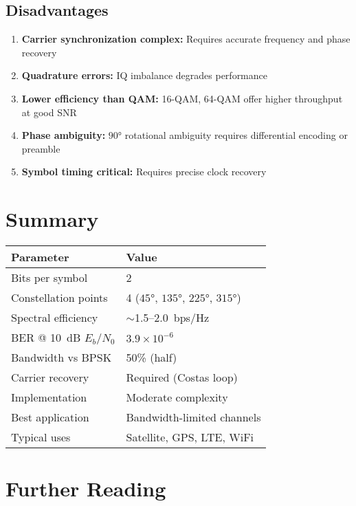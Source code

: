 \subsection*{Disadvantages}

\begin{enumerate}
\item \textbf{Carrier synchronization complex:} Requires accurate frequency and phase recovery
\item \textbf{Quadrature errors:} IQ imbalance degrades performance
\item \textbf{Lower efficiency than QAM:} 16-QAM, 64-QAM offer higher throughput at good SNR
\item \textbf{Phase ambiguity:} $90°$ rotational ambiguity requires differential encoding or preamble
\item \textbf{Symbol timing critical:} Requires precise clock recovery
\end{enumerate}

\section{Summary}

\begin{center}
\begin{tabular}{@{}ll@{}}
\toprule
\textbf{Parameter} & \textbf{Value} \\
\midrule
Bits per symbol & 2 \\
Constellation points & 4 ($45°$, $135°$, $225°$, $315°$) \\
Spectral efficiency & $\sim$1.5--2.0~bps/Hz \\
BER @ 10~dB $E_b/N_0$ & $3.9 \times 10^{-6}$ \\
Bandwidth vs BPSK & 50\% (half) \\
Carrier recovery & Required (Costas loop) \\
Implementation & Moderate complexity \\
Best application & Bandwidth-limited channels \\
Typical uses & Satellite, GPS, LTE, WiFi \\
\bottomrule
\end{tabular}
\end{center}

\section{Further Reading}


